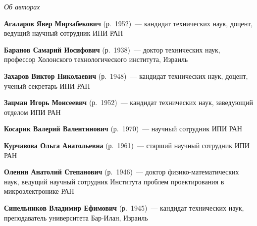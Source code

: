 \vspace*{-48pt}
\begin{center}\LARGE
\textit{Об авторах}
\end{center}
\thispagestyle{empty}

\vspace*{12pt}


\begin{multicols}{2}


\noindent
\textbf{Агаларов Явер Мирзабекович} (р.\ 1952)~---  кандидат технических наук,
доцент, ведущий научный сотрудник ИПИ РАН

\vspace*{5pt}

\noindent
\textbf{Баранов Самарий Иосифович} (р.\ 1938)~---  доктор технических наук, 
профессор Холонского технологического института, Израиль

\vspace*{5pt}

\noindent
\textbf{Захаров Виктор Николаевич} (р.\ 1948)~---   кандидат технических наук, 
доцент, ученый секретарь ИПИ РАН


\vspace*{5pt}

\noindent
\textbf{Зацман Игорь Моисеевич} (р.\ 1952)~---   кандидат технических наук, 
заведующий отделом ИПИ РАН

\vspace*{5pt}

\noindent
\textbf{Косарик Валерий Валентинович} (р.\ 1970)~---  научный сотрудник ИПИ РАН

\vspace*{5pt}

\noindent
\textbf{Курчавова Ольга Анатольевна} (р.\ 1961)~---  старший научный сотрудник ИПИ РАН

\vspace*{5pt}

\noindent
\textbf{Оленин Анатолий Степанович} (р.\ 1946)~---  доктор 
физико-математических наук, ведущий научный сотрудник Института проблем проектирования
в микроэлектронике РАН


\noindent
\textbf{Синельников Владимир Ефимович} (р.\ 1945)~---  кандидат технических наук, 
преподаватель университета Бар-Илан, Израиль


\end{multicols}
